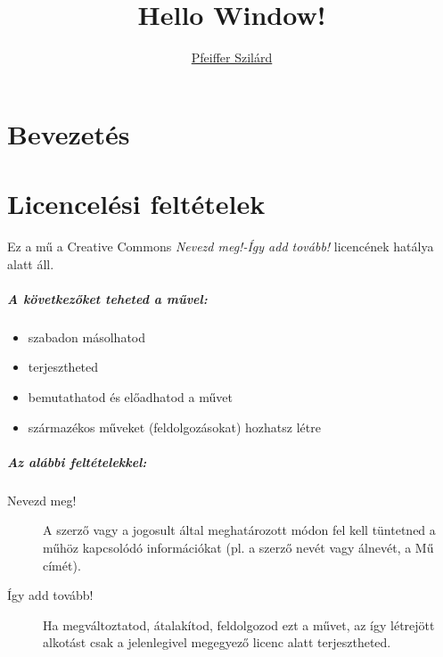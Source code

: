 \documentclass[a4paper, titlepage]{report}
\author{
\href{http://pfeifferszilard.hu}{Pfeiffer Szilárd}
}
\title{Hello Window!}
\begin{document}
\maketitle

\tableofcontents
\newpage
{}

\chapter{Bevezetés}







\appendix

\chapter{Licencelési feltételek}

Ez a mű a Creative Commons \textit{Nevezd meg!-Így add tovább!} licencének hatálya alatt áll.

\paragraph{A következőket teheted a művel:}

\begin{itemize}
 \item szabadon másolhatod
 \item terjesztheted
 \item bemutathatod és előadhatod a művet 
 \item származékos műveket (feldolgozásokat) hozhatsz létre
\end{itemize}

\paragraph{Az alábbi feltételekkel:}

\begin{description}
 \item[Nevezd meg!] A szerző vagy a jogosult által meghatározott módon fel kell tüntetned a műhöz kapcsolódó információkat (pl. a szerző nevét vagy álnevét, a Mű címét).
 \item[Így add tovább!] Ha megváltoztatod, átalakítod, feldolgozod ezt a művet, az így létrejött alkotást csak a jelenlegivel megegyező licenc alatt terjesztheted.
\end{description}
\end{document}
